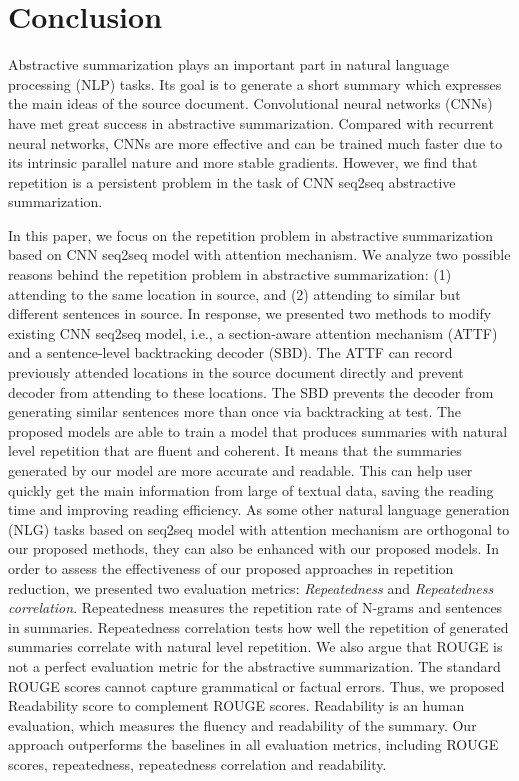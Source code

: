 \section{Conclusion}
\label{sec:conclude}
Abstractive summarization plays an important part in natural 
language processing (NLP) tasks.
Its goal is to generate a short summary which expresses the main ideas 
of the source document.
Convolutional neural networks (CNNs) have
met great success in abstractive summarization.
Compared with recurrent neural networks, 
CNNs are more effective and can be trained much faster due to 
its intrinsic parallel nature and more stable gradients.
However, we find that repetition is a persistent problem in the task of CNN seq2seq abstractive summarization. 

In this paper, we focus on the repetition problem in abstractive summarization based on CNN seq2seq model with attention mechanism.
We analyze two possible reasons behind the repetition problem in abstractive
summarization: (1) attending to the same location in source,
and (2) attending to similar but different sentences in source. 
In response, 
we presented two methods to modify existing CNN seq2seq model, i.e.,
a section-aware attention mechanism (ATTF)
and a sentence-level backtracking decoder (SBD). 
The ATTF can record previously attended locations in the source document directly 
and prevent decoder from attending to these locations. 
The SBD prevents the decoder from generating similar sentences more than once via backtracking at test.
The proposed models are able to train a model that produces 
summaries with natural level repetition that are fluent and coherent. 
It means that the summaries generated by our model are more accurate and 
readable. This can help user quickly get the main information from large of textual data,
saving the reading time and improving reading efficiency.
As some other natural language generation (NLG) tasks based on seq2seq model with attention mechanism
are orthogonal to our proposed methods,
they can also be enhanced with our proposed models.
In order to assess the effectiveness of our proposed approaches in repetition reduction, 
we presented two evaluation metrics: \textit{Repeatedness} and \textit{Repeatedness correlation}.
Repeatedness measures the repetition rate of N-grams and sentences in summaries. 
Repeatedness correlation tests how well the repetition of generated summaries 
correlate with natural level repetition.
We also argue that ROUGE is not a perfect evaluation metric for the abstractive 
summarization. The standard ROUGE scores cannot capture grammatical or factual errors.
Thus, we proposed Readability score to complement ROUGE scores.
Readability is an human evaluation, which measures the fluency and readability of the
summary. 
Our approach outperforms the baselines in 
all evaluation metrics, including ROUGE scores, repeatedness, 
repeatedness correlation and readability.
